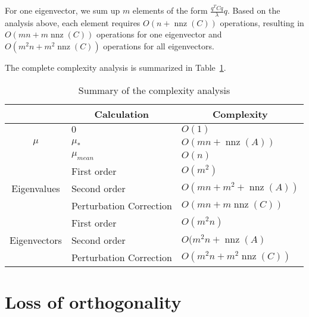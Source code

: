 \documentclass[11pt]{article}
\begin{document}
For one eigenvector, we sum up $m$ elements of the form $\frac{q^TCq}{\lambda}q$. Based on the analysis above, each element requires $O(n + \operatorname{nnz}(C))$ operations, resulting in $O(mn + m\operatorname{nnz}(C))$ operations for one eigenvector and $O(m^2n + m^2\operatorname{nnz}(C))$ operations for all eigenvectors. 

The complete complexity analysis is summarized in Table~\ref{tbl:complexity}.

\begin{table}
\centering
\begin{tabular}{|c|l|l|}
\hline
                              & \multicolumn{1}{c|}{Calculation} & \multicolumn{1}{c|}{Complexity}                                 \\ \hline
\multirow{3}{*}{$\mu$}        & $0$                            & $O(1)$                                                          \\ \cline{2-3} 
                              & $\mu_\ast$                    & $O(mn + \operatorname{nnz}(A))$                                 \\ \cline{2-3} 
                              & $\mu_{mean}$                   & $O(n)$                                                          \\ \hline
\multirow{3}{*}{Eigenvalues}  & First order                    & $O(m^2)$                              \\ \cline{2-3} 
                              & Second order                   & $O(mn + m^2 + \operatorname{nnz}(A))$ \\ \cline{2-3} 
                              & Perturbation Correction        & $O(mn + m \operatorname{nnz}(C))$                               \\ \hline
\multirow{3}{*}{Eigenvectors} & First order                    & $O(m^2n)$                              \\ \cline{2-3} 
                              & Second order                   & $O(m^2n + \operatorname{nnz}(A)$      \\ \cline{2-3} 
                              & Perturbation Correction        & $O(m^2n + m^2 \operatorname{nnz}(C))$                           \\ \hline
\end{tabular}
\caption{Summary of the complexity analysis}
 \label{tbl:complexity}
\end{table}

\section{Loss of orthogonality} \label{app:loss_orth}
\end{document}
